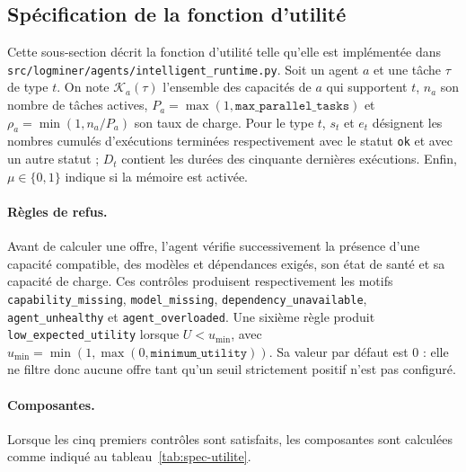 \subsection{Spécification de la fonction d'utilité}
\label{sec:spec-utilite}

Cette sous-section décrit la fonction d'utilité telle qu'elle est implémentée dans
\texttt{src/logminer/agents/intelligent\_runtime.py}. Soit un agent $a$ et une tâche
$\tau$ de type $t$. On note $\mathcal{K}_a(\tau)$ l'ensemble des capacités de $a$ qui
supportent $t$, $n_a$ son nombre de tâches actives,
$P_a=\max(1,\texttt{max\_parallel\_tasks})$ et
$\rho_a=\min(1,n_a/P_a)$ son taux de charge. Pour le type $t$, $s_t$ et $e_t$
désignent les nombres cumulés d'exécutions terminées respectivement avec le statut
\texttt{ok} et avec un autre statut ; $D_t$ contient les durées des cinquante dernières
exécutions. Enfin, $\mu\in\{0,1\}$ indique si la mémoire est activée.

\paragraph{Règles de refus.}
Avant de calculer une offre, l'agent vérifie successivement la présence d'une capacité
compatible, des modèles et dépendances exigés, son état de santé et sa capacité de charge.
Ces contrôles produisent respectivement les motifs
\texttt{capability\_missing}, \texttt{model\_missing},
\texttt{dependency\_unavailable}, \texttt{agent\_unhealthy} et
\texttt{agent\_overloaded}. Une sixième règle produit
\texttt{low\_expected\_utility} lorsque $U<u_{\min}$, avec
$u_{\min}=\min(1,\max(0,\texttt{minimum\_utility}))$. Sa valeur par défaut est 0 :
elle ne filtre donc aucune offre tant qu'un seuil strictement positif n'est pas configuré.

\paragraph{Composantes.}
Lorsque les cinq premiers contrôles sont satisfaits, les composantes sont calculées comme
indiqué au tableau~\ref{tab:spec-utilite}.

